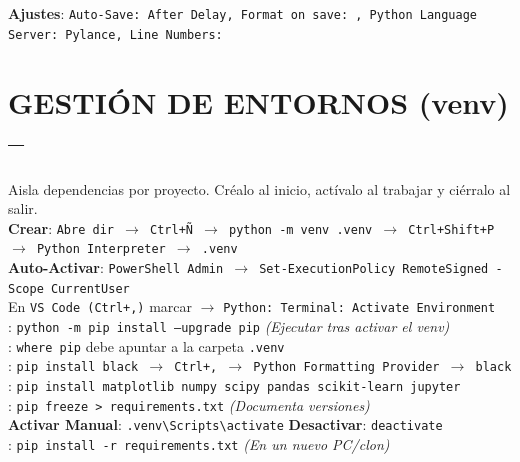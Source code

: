 \textbf{Ajustes}: \texttt{Auto-Save:\,After Delay, Format on save:\,\checkmark, Python Language Server:\,Pylance, Line Numbers:\,\checkmark}




\section{GESTIÓN DE ENTORNOS (venv) -- }
Aisla dependencias por proyecto. Créalo al inicio, actívalo al trabajar y ciérralo al salir.\\
\textbf{Crear}: \texttt{Abre dir $\rightarrow$ Ctrl+Ñ $\rightarrow$ python -m venv .venv $\rightarrow$ Ctrl+Shift+P $\rightarrow$ Python Interpreter $\rightarrow$ .venv}\\
\textbf{Auto-Activar}: \texttt{PowerShell Admin $\rightarrow$ Set-ExecutionPolicy RemoteSigned -Scope CurrentUser}\\
En \texttt{VS Code (Ctrl+,)} marcar $\rightarrow$ \texttt{Python: Terminal: Activate Environment}\\
\hypertarget{pip_venv}{
}: \texttt{python -m pip install --upgrade pip} \textit{(Ejecutar tras activar el venv)}\\
: \texttt{where pip} debe apuntar a la carpeta \texttt{.venv}\\
: \texttt{pip install black $\rightarrow$ Ctrl+, $\rightarrow$ Python Formatting Provider $\rightarrow$ black}\\
: \texttt{pip install matplotlib numpy scipy pandas scikit-learn jupyter}\\
: \texttt{pip freeze > requirements.txt} \textit{(Documenta versiones)}\\
\textbf{Activar Manual}: \texttt{.venv\textbackslash Scripts\textbackslash activate} \;\;\; \textbf{Desactivar}: \texttt{deactivate}\\ 
: \texttt{pip install -r requirements.txt} \textit{(En un nuevo PC/clon)}


